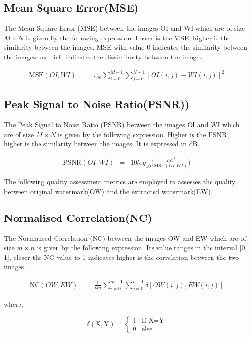 \subsection{Mean Square Error(MSE)}
The Mean Square Error (MSE) between the images OI and WI which are of size  $M \times N$ is given by the following expression. Lower is the MSE, higher is the similarity between the images. MSE with value $0$ indicates the similarity between the images and $\inf $ indicates the dissimilarity  between the images.

\begin{eqnarray}
\nonumber
\text{MSE}(OI,WI)&=&\frac{1}{MN}\sum_{i=0}^{M-1}\sum_{j=0}^{N-1}[OI(i,j)-WI(i,j)]^2
\nonumber
\end{eqnarray}

\subsection{Peak Signal to Noise Ratio(PSNR))}
The Peak Signal to Noise Ratio (PSNR) between the images OI and WI which are of size  $M \times N$ is given by the following expression. Higher is the PSNR, higher is the similarity between the images. It is expressed in dB.

\begin{eqnarray}
\nonumber
\text{PSNR}(OI,WI)&=& 10log_{10}\bigl(\frac{255^2}{\text{MSE}(OI,WI)}\bigl)
\nonumber
\end{eqnarray}

The following quality assessment metrics are employed to assesses the quality between original watermark(OW) and the extracted watermark(EW).

\subsection{Normalised Correlation(NC)} 
The Normalised Correlation (NC) between the images OW and EW which are of size $m \times n$ is given by the following expression. Its value ranges in the interval [0 1], closer the NC value to 1 indicates higher is the correlation between the two images.

\begin{eqnarray}
\nonumber
\text{NC}(OW,EW)&=&\frac{1}{mn}\sum_{i=0}^{m-1}\sum_{j=0}^{n-1}\delta[OW(i,j), EW(i,j)] 
\nonumber
\end{eqnarray}

where,

\begin{equation}
  \nonumber
  \delta(\text{X},\text{Y}) = \left\{ \begin{matrix} 1  & \text{If X}=\text{Y} \\ 0 &  \text{else}   \end{matrix} \right. 
  \end{equation}
  
